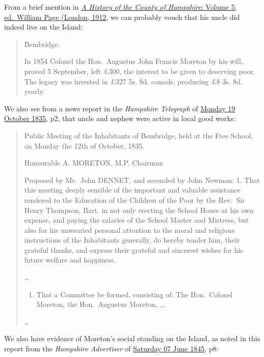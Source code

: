 \documentclass[
  12pt,
  a5paper,
  twoside]{book}
\providecommand{\tightlist}{%
  \setlength{\itemsep}{0pt}\setlength{\parskip}{0pt}}\usepackage{longtable,booktabs,array}
\begin{document}
From a brief mention in
\href{https://www.british-history.ac.uk/vch/hants/vol5/pp156-170}{\emph{A
History of the County of Hampshire}: Volume 5, ed.~William Page (London,
1912}, we can probably vouch that his uncle did indeed live on the
Island:

\begin{quote}
Bembridge.

In 1854 Colonel the Hon.~Augustus John Francis Moreton by his will,
proved 5 September, left £300, the interest to be given to deserving
poor. The legacy was invested in £327 5s. 8d. consols, producing £8 3s.
8d. yearly.
\end{quote}

We also see from a news report in the \emph{Hampshire Telegraph} of
\href{https://www.britishnewspaperarchive.co.uk/viewer/bl/0000069/18351019/006/0002}{Monday
19 October 1835}, p2, that uncle and nephew were active in local good
works:

\begin{quote}
Public Meeting of the Inhabitants of Bembridge, held at the Free School,
on Monday the 12th of October, 1835.

Honourable A. MORETON, M.P. Chairman

Proposed by Mr.~John DENNET, and seconded by John Newman: 1. That this
meeting deeply sensible of the important and valuable assistance
rendered to the Education of the Children of the Poor by the Rev.~Sir
Henry Thompson, Bart. in not only erecting the School House at his own
expense, and paying the salaries of the School Master and Mistress, but
also for his unwearied personal attention to the moral and religious
instructions of the Inhabitants generally, do hereby tender him, their
grateful thanks, and express their grateful and sincerest wishes for his
future welfare and happiness.

\ldots{}

\begin{enumerate}
\def\labelenumi{\arabic{enumi}.}
\setcounter{enumi}{2}
\tightlist
\item
  That a Committee be formed, consisting of: The Hon.~Colonel Moreton,
  the Hon.~Augustus Moreton, \ldots{}
\end{enumerate}

\ldots{}
\end{quote}

We also have evidence of Moreton's social standing on the Island, as
noted in this report from the \emph{Hampshire Advertiser} of
\href{https://www.britishnewspaperarchive.co.uk/viewer/bl/0000494/18450607/034/0008}{Saturday
07 June 1845}, p8:
\end{document}
